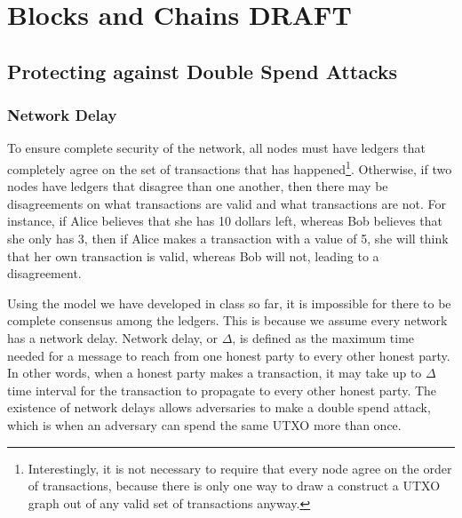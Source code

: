 \chapter{Blocks and Chains \small{\textsf{DRAFT}}}

\section{Protecting against Double Spend Attacks}

\subsection{Network Delay}

To ensure complete security of the network, all nodes must have ledgers that completely agree on the set of transactions that has happened\footnote{Interestingly, it is not necessary to require that every node agree on the order of transactions, because there is only one way to draw a construct a UTXO graph out of any valid set of transactions anyway.}. Otherwise, if two nodes have ledgers that disagree than one another, then there may be disagreements on what transactions are valid and what transactions are not. For instance, if Alice believes that she has 10 dollars left, whereas Bob believes that she only has 3, then if Alice makes a transaction with a value of 5, she will think that her own transaction is valid, whereas Bob will not, leading to a disagreement.

Using the model we have developed in class so far, it is impossible for there to be complete consensus among the ledgers. This is because we assume every  network has a network delay. Network delay, or $\Delta$, is defined as the maximum time needed for a message to reach from one honest party to every other honest party. In other words, when a honest party makes a transaction, it may take up to $\Delta$ time interval for the transaction to propagate to every other honest party. The existence of network delays allows adversaries to make a double spend attack, which is when an adversary can spend the same UTXO more than once.

